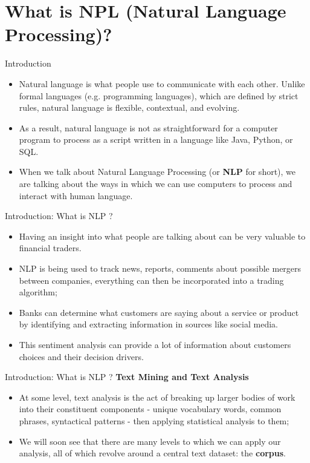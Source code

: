 \documentclass[11pt]{beamer}
\begin{document}
\section{What is NPL (Natural Language Processing)?}
\begin{frame}{Introduction	}
	\begin{itemize}
		\item Natural language is what people use to communicate with each other. Unlike formal languages (e.g. programming languages), which are defined by strict rules, natural language is flexible, contextual, and evolving. 
		\item As a result, natural language is not as straightforward for a computer program to process as a script written in a language like Java, Python, or SQL. 
		\item When we talk about Natural Language Processing (or \textbf{NLP} for short), we are talking about the ways in which we can use computers to process and interact with human language.
	\end{itemize}
\end{frame}
\begin{frame}{Introduction: What is NLP ?}
	\begin{itemize}
		\item Having an insight into what people are talking about can be very valuable to financial traders. 
		\item NLP is being used to track news, reports, comments about possible mergers between companies, everything can then be  incorporated into a trading algorithm;
		\item Banks can determine what customers are saying about a service or product by identifying and extracting information in sources like social media. 
		\item This sentiment analysis can provide a lot of information about customers choices and their decision drivers.
	\end{itemize}
\end{frame}
\begin{frame}{Introduction: What is NLP ?}
\textbf{Text Mining and Text Analysis}
	\begin{itemize}
		\item At some level, text analysis is the act of breaking up larger bodies of work into their constituent components - unique vocabulary words, common phrases, syntactical patterns - then applying statistical analysis to them;
		\item We will soon see that there are many levels to which we can apply our analysis, all of which revolve around a central text dataset: the \textbf{corpus}.
	\end{itemize}
\end{frame}
\end{document}
